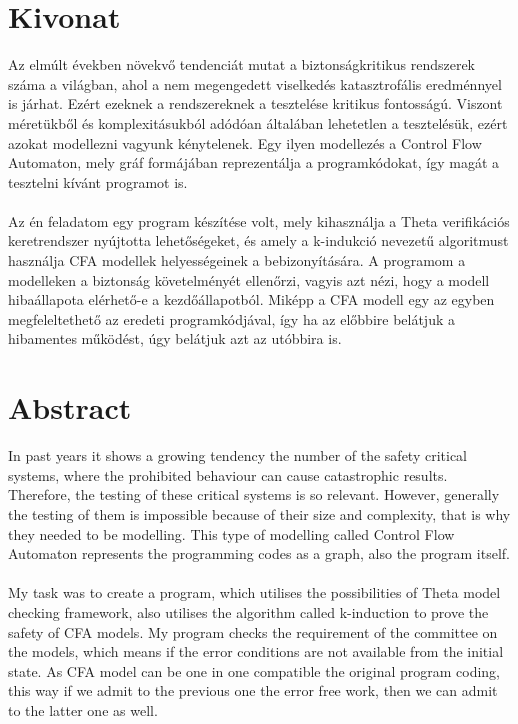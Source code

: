 \setcounter{page}{1}

\selecthungarian

\chapter*{Kivonat}

Az elmúlt években növekvő tendenciát mutat a biztonságkritikus rendszerek száma a világban, ahol a nem megengedett viselkedés katasztrofális eredménnyel is járhat. Ezért ezeknek a rendszereknek a tesztelése kritikus fontosságú. Viszont méretükből és komplexitásukból adódóan általában lehetetlen a tesztelésük, ezért azokat modellezni vagyunk kénytelenek. Egy ilyen modellezés a Control Flow Automaton, mely gráf formájában reprezentálja a programkódokat, így magát a tesztelni kívánt programot is.
\\
\\
Az én feladatom egy program készítése volt, mely kihasználja a Theta verifikációs keretrendszer nyújtotta lehetőségeket, és amely a k-indukció nevezetű algoritmust használja CFA modellek helyességeinek a bebizonyítására. A programom a modelleken a biztonság követelményét ellenőrzi, vagyis azt nézi, hogy a modell hibaállapota elérhető-e a kezdőállapotból. Miképp a CFA modell egy az egyben megfeleltethető az eredeti programkódjával, így ha az előbbire belátjuk a hibamentes működést, úgy belátjuk azt az utóbbira is.

\vfill
\selectenglish


\chapter*{Abstract}

In past years it shows a growing tendency the number of the safety critical systems, where the prohibited behaviour can cause catastrophic results. Therefore, the testing of these critical systems is so relevant. However, generally the testing of them is impossible because of their size and complexity, that is why they needed to be modelling. This type of modelling called Control Flow Automaton represents the programming codes as a graph, also the program itself. 
\\
\\
My task was to create a program, which utilises the possibilities of Theta model checking framework, also utilises the algorithm called k-induction to prove the safety of CFA models. My program checks the requirement of the committee on the models, which means if the error conditions are not available from the initial state. As CFA model can be one in one compatible the original program coding, this way if we admit to the previous one the error free work, then we can admit to the latter one as well. 

\vfill
\cleardoublepage

\selectthesislanguage

\setcounter{romanPage}{\value{page}}
